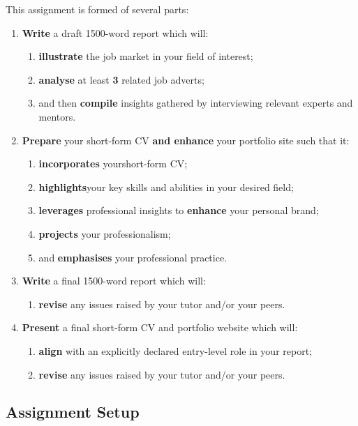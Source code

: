 \documentclass{../../fal_assignment}
\newcommand{\essayWordCount}{1500}
\newcommand{\minReferenceCount}{3}
\begin{document}
This assignment is formed of several parts:

\begin{enumerate}[label=(\Alph*)]
    \item \textbf{Write} a draft \essayWordCount-word report which will:
    	\begin{enumerate}[label=\roman*.]
    		\item \textbf{illustrate} the job market in your field of interest;
    		\item \textbf{analyse} at least \textbf{\minReferenceCount} related job adverts;
       		\item and then \textbf{compile} insights gathered by interviewing relevant experts and mentors. 		
	\end{enumerate}
    \item \textbf{Prepare} your short-form CV \textbf{and enhance} your portfolio site such that it:
    	\begin{enumerate}[label=\roman*.]
    		\item \textbf{incorporates} yourshort-form CV;
    		\item \textbf{highlights}your key skills and abilities in your desired field;
    		\item \textbf{leverages} professional insights to \textbf{enhance} your personal brand;
    		\item \textbf{projects} your professionalism;
    		\item and \textbf{emphasises} your professional practice.
	\end{enumerate}
    \item \textbf{Write} a final \essayWordCount-word report which will:
    	\begin{enumerate}[label=\roman*.]
    		\item \textbf{revise} any issues raised by your tutor and/or your peers.
	\end{enumerate}
    \item \textbf{Present} a final short-form CV and portfolio website which will:
    	\begin{enumerate}[label=\roman*.]
    		\item \textbf{align} with an explicitly declared entry-level role in your report;
    		\item \textbf{revise} any issues raised by your tutor and/or your peers.
	\end{enumerate}
\end{enumerate}

\subsection*{Assignment Setup}
\end{document}
